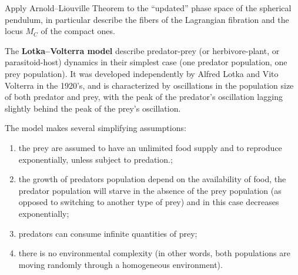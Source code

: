 \documentclass[main.tex]{subfiles}
\begin{document}
\begin{exercise}
	Apply Arnold--Liouville Theorem to the ``updated'' phase space of the spherical pendulum, in particular describe the fibers of the Lagrangian fibration and the locus $M_C$ of the compact ones.
\end{exercise}

\begin{example}
	The \textbf{Lotka--Volterra model} describe predator-prey (or herbivore-plant, or parasitoid-host) dynamics in their simplest case (one predator population, one prey population). It was developed independently by Alfred Lotka and Vito Volterra in the 1920's, and is characterized by oscillations in the population size of both predator and prey, with the peak of the predator's oscillation lagging slightly behind the peak of the prey's oscillation. 
	
	The model makes several simplifying assumptions: 
	\begin{enumerate}
		\item the prey are assumed to have an unlimited food supply and to reproduce exponentially, unless subject to predation.; 
		\item the growth of predators population depend on the availability of food, the predator population will starve in the absence of the prey population (as opposed to switching to another type of prey) and in this case decreases exponentially; 
		\item predators can consume infinite quantities of prey; 
		\item there is no environmental complexity (in other words, both populations are moving randomly through a homogeneous environment).
	\end{enumerate}
	

\end{example}
\end{document}
